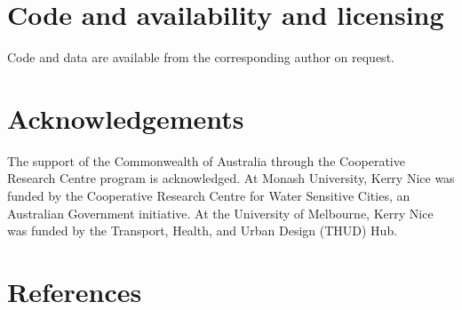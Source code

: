 \documentclass[final,3p,times,authoryear]{elsarticle}
\begin{document}
\section{Code and availability and licensing}\label{sec:available}
Code and data are available from the corresponding author on request.





\section*{Acknowledgements}
The support of the Commonwealth of Australia through the Cooperative Research Centre program is acknowledged. At Monash University, Kerry Nice was funded by the Cooperative Research Centre for Water Sensitive Cities, an Australian Government initiative. At the University of Melbourne, Kerry Nice was funded by the Transport, Health, and Urban Design (THUD) Hub. 
 

\section*{References}\label{sec:ref}
   
  


%
%
%


\end{document}
